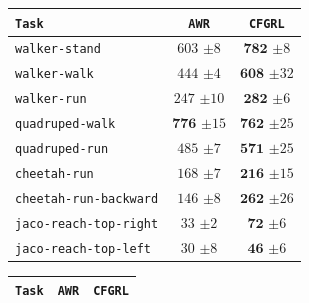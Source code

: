\documentclass{article}
\begin{document}
\begin{table}[t!]
\label{table:aggregation}
\centering
\vspace{-10pt}
\begin{minipage}{.47\linewidth}
\centering
{}
\vspace{5pt}
\scalebox{0.8}
{
\begin{tabular}{lcc}
\toprule
\texttt{Task} & \texttt{AWR} & \texttt{\color{myred}CFGRL} \\
\midrule

\texttt{walker-stand} & $603$ {\tiny $\pm 8$} & $\mathbf{782}$ {\tiny $\pm 8$} \\
\texttt{walker-walk} & $444$ {\tiny $\pm 4$} & $\mathbf{608}$ {\tiny $\pm 32$} \\
\texttt{walker-run} & $247$ {\tiny $\pm 10$} & $\mathbf{282}$ {\tiny $\pm 6$} \\
\texttt{quadruped-walk} & $\mathbf{776}$ {\tiny $\pm 15$} & $\mathbf{762}$ {\tiny $\pm 25$} \\
\texttt{quadruped-run} & $485$ {\tiny $\pm 7$} & $\mathbf{571}$ {\tiny $\pm 25$} \\
\texttt{cheetah-run} & $168$ {\tiny $\pm 7$} & $\mathbf{216}$ {\tiny $\pm 15$} \\
\texttt{cheetah-run-backward} & $146$ {\tiny $\pm 8$} & $\mathbf{262}$ {\tiny $\pm 26$} \\
\texttt{jaco-reach-top-right} & $33$ {\tiny $\pm 2$} & $\mathbf{72}$ {\tiny $\pm 6$} \\
\texttt{jaco-reach-top-left} & $30$ {\tiny $\pm 8$} & $\mathbf{46}$ {\tiny $\pm 6$} \\

\bottomrule
\end{tabular}
}
\end{minipage}%
\begin{minipage}{.53\linewidth}
\centering
{}
\vspace{5pt}
\scalebox{0.8}
{
\begin{tabular}{lcc}
\toprule
\texttt{Task} & \texttt{AWR} & \texttt{\color{myred}CFGRL} \\
\midrule


\end{tabular}}
\end{minipage}
\end{table}
\end{document}
